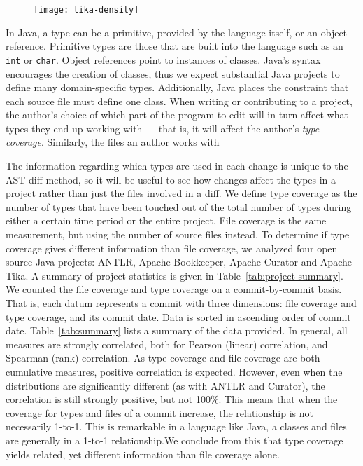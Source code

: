 \begin{figure}[h]
\centering
\texttt{[image: tika-density]}
\caption{}
\end{figure}

In Java, a type can be a primitive, provided by the language itself, or an object reference. Primitive types are those that are built into the language such as an \texttt{int} or \texttt{char}. Object references point to instances of classes. Java's syntax encourages the creation of classes, thus we expect substantial Java projects to define many domain-specific types. Additionally, Java places the constraint that each source file must define one class. When writing or contributing to a project, the author's choice of which part of the program to edit will in turn affect what types they end up working with --- that is, it will affect the author's \emph{type coverage}. Similarly, the files an author works with 

The information regarding which types are used in each change is unique to the AST diff method, so it will be useful to see how changes affect the types in a project rather than just the files involved in a diff. We define type coverage as the number of types that have been touched out of the total number of types during either a certain time period or the entire project. File coverage is the same measurement, but using the number of source files instead. To determine if type coverage gives different information than file coverage, we analyzed four open source Java projects: ANTLR, Apache Bookkeeper, Apache Curator and Apache Tika. A summary of project statistics is given in Table~\ref{tab:project-summary}. We counted the file coverage and type coverage on a commit-by-commit basis. That is, each datum represents a commit with three dimensions: file coverage and type coverage, and its commit date. Data is sorted in ascending order of commit date. Table~\ref{tab:summary} lists a summary of the data provided. In general, all measures are strongly correlated, both for Pearson (linear) correlation, and Spearman (rank) correlation. As type coverage and file coverage are both cumulative measures, positive correlation is expected. However, even when the distributions are significantly different (as with ANTLR and Curator), the correlation is still strongly positive, but not 100\%. This means that when the coverage for types and files of a commit increase, the relationship is not necessarily 1-to-1. This is remarkable in a language like Java, a classes and files are generally in a 1-to-1 relationship.We conclude from this that type coverage yields related, yet different information than file coverage alone.

